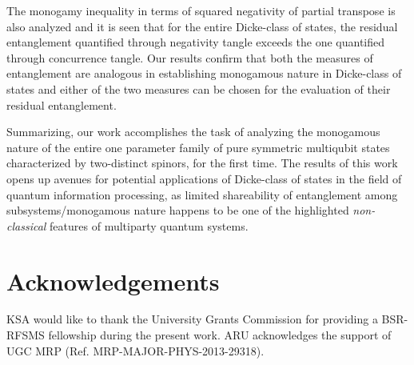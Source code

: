 \documentclass[pra,a4paper,showpacs,superscriptaddress]{revtex4}
\begin{document}
The monogamy inequality in terms of squared negativity of partial transpose is also analyzed and it is seen that for the entire Dicke-class of states, the residual entanglement quantified through negativity tangle exceeds the one quantified through concurrence tangle. Our results confirm that both the measures of entanglement are analogous in establishing monogamous nature in Dicke-class of states and either of the two measures can be chosen for the evaluation of their residual entanglement.  

Summarizing, our work accomplishes the task of analyzing the monogamous nature of the entire one parameter family of pure symmetric multiqubit states characterized by two-distinct spinors, for the first time. The results of this work opens up avenues for potential applications of Dicke-class of states in the field of quantum information processing, as limited shareability of entanglement among subsystems/monogamous nature happens to be one of the highlighted {\emph{non-classical}} features of multiparty quantum systems.


\section*{Acknowledgements}
KSA would like to thank the University Grants Commission for providing a BSR-RFSMS fellowship during the present work. ARU acknowledges the support of UGC MRP (Ref. MRP-MAJOR-PHYS-2013-29318). 
\end{document}
